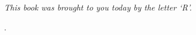 

\newpage

\vspace*{7cm}
\begin{center}
{\it \large
This book was brought to you today by the letter `R'.
}
\end{center}

\newpage

.%


\newpage
